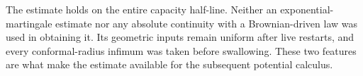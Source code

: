 \begin{remark}\label{eng:scope}
The estimate holds on the entire capacity half-line.  Neither an
exponential-martingale estimate nor any absolute continuity with a
Brownian-driven law was used in obtaining it.  Its geometric inputs
remain uniform after live restarts, and every conformal-radius infimum
was taken before swallowing.  These two features are what make the
estimate available for the subsequent potential calculus.
\end{remark}
